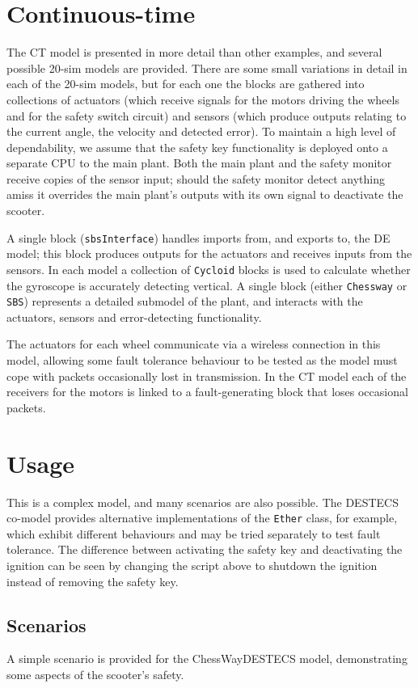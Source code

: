 \section{Continuous-time} The CT model is presented in more
detail than other examples, and several possible 20-sim models
are provided. There are some small variations in detail in each
of the 20-sim models, but for each one the blocks are gathered
into collections of actuators (which receive signals for the
motors driving the wheels and for the safety switch circuit) and
sensors (which produce outputs relating to the current angle,
the velocity and detected error). To maintain a high level of
dependability, we assume that the safety key functionality is
deployed onto a separate CPU to the main plant. Both the main
plant and the safety monitor receive copies of the sensor input;
should the safety monitor detect anything amiss it overrides the
main plant's outputs with its own signal to deactivate the
scooter.

A single block (\texttt{sbsInterface}) handles imports from, and
exports to, the DE model; this block produces outputs for the actuators and
receives inputs from the sensors. In each model a collection of
\texttt{Cycloid} blocks is used to calculate whether the
gyroscope is accurately detecting vertical. A single block
(either \texttt{Chessway} or \texttt{SBS}) represents a detailed
submodel of the plant, and interacts with the actuators, sensors
and error-detecting functionality.

The actuators for each wheel communicate via a wireless
connection in this model, allowing some fault tolerance
behaviour to be tested as the model must cope with packets
occasionally lost in transmission. In the CT model each of the
receivers for the motors is linked to a fault-generating block
that loses occasional packets.

\section{Usage}
This is a complex model, and many scenarios are also possible.  The
DESTECS co-model provides alternative implementations of the
\texttt{Ether} class, for example, which exhibit different behaviours
and may be tried separately to test fault tolerance.  The difference
between activating the safety key and deactivating the ignition can be
seen by changing the script above to shutdown the ignition instead of
removing the safety key.

\subsection{Scenarios}
A simple scenario is provided for the
ChessWayDESTECS model, demonstrating some aspects of the
scooter's safety.

